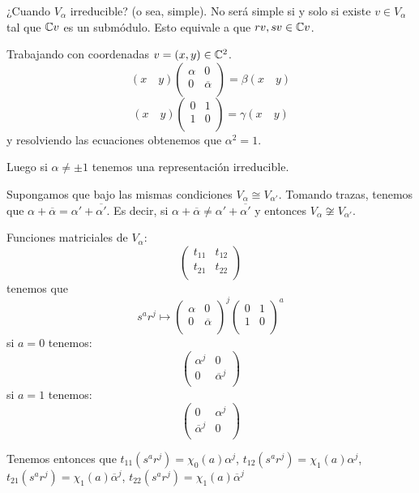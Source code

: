 ¿Cuando \(V_\alpha\) irreducible? (o sea, simple). No será simple si y solo
si existe \(v\in V_\alpha\) tal que \(\mathbb{C} v\) es un submódulo. Esto equivale
a que \(rv, sv\in \mathbb{C} v\).

Trabajando con coordenadas \(v=(x,y)\in\mathbb{C}^2\).
\[
  (x\quad y)
  \begin{pmatrix}
    \alpha&0\\
    0&\overline{\alpha}\\
  \end{pmatrix}
  =\beta(x\quad y)
\]
\[
  (x\quad y)
  \begin{pmatrix}
    0&1\\
    1&0\\
  \end{pmatrix}
  =\gamma(x\quad y)
\]
y resolviendo las ecuaciones obtenemos que \(\alpha^2=1\).

Luego si \(\alpha\neq\pm 1\) tenemos una representación irreducible.

Supongamos que bajo las mismas condiciones \(V_\alpha\cong V_{\alpha'}\).
Tomando trazas, tenemos que \(\alpha+\overline{\alpha}=
\alpha'+\overline{\alpha'}\). Es decir, si \(\alpha+\overline{\alpha}\neq
\alpha'+\overline{\alpha'}\) y entonces \(V_\alpha\not\cong V_{\alpha'}\).

Funciones matriciales de \(V_\alpha\):
\[
  \begin{pmatrix}
    t_{11}  & t_{12}\\
    t_{21}  & t_{22}\\
  \end{pmatrix}
\]
tenemos que
\[
  s^a r^j\mapsto
  \begin{pmatrix}
    \alpha  & 0\\
    0       & \overline{\alpha}\\
  \end{pmatrix}^j
  \begin{pmatrix}
    0 & 1\\
    1 & 0\\
  \end{pmatrix}^a
\]
si \(a=0\) tenemos:
\[
  \begin{pmatrix}
    \alpha^j  & 0\\
    0       & \overline{\alpha}^j\\
  \end{pmatrix}
\]
si \(a=1\) tenemos:
\[
  \begin{pmatrix}
    0&\alpha^j\\
    \overline{\alpha}^j& 0\\
  \end{pmatrix}
\]

Tenemos entonces que \(t_{11}(s^a r^j)=\chi_{0}(a)\alpha^j\),
\(t_{12}(s^a r^j)=\chi_{1}(a)\alpha^j\),
\(t_{21}(s^a r^j)=\chi_{1}(a)\overline{\alpha}^j\),
\(t_{22}(s^a r^j)=\chi_{1}(a)\overline{\alpha}^j\)

